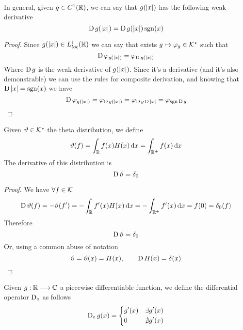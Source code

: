 \documentclass[../complete.tex]{subfiles}
\begin{document}
\begin{thm}
	In general, given $g\in C^1(\mathbb{R})$, we can say that $g(\abs{x})$ has the following weak derivative
	\begin{equation*}
		\operatorname{\mathrm{D}} g(\abs{x})=\operatorname{\mathrm{D}} g(\abs{x})\operatorname{sgn}(x)
	\end{equation*}
\end{thm}
\begin{proof}
	Since $g(\abs{x})\in L^1_{loc}(\mathbb{R})$ we can say that exists $g\mapsto\varphi_g\in\mathcal{K}^\star$ such that
	\begin{equation*}
		\operatorname{\mathrm{D}}\varphi_{g(\abs{x})}=\varphi_{\operatorname{\mathrm{D}} g(\abs{x})}
	\end{equation*}
	Where $\operatorname{\mathrm{D}} g$ is the weak derivative of $g(\abs{x})$. Since it's a derivative (and it's also demonstrable) we can use the rules for composite derivation, and knowing that $\operatorname{\mathrm{D}}\abs{x}=\operatorname{sgn}(x)$ we have
	\begin{equation*}
		\operatorname{\mathrm{D}}\varphi_{g(\abs{x})}=\varphi_{\operatorname{\mathrm{D}} g(\abs{x})}=\varphi_{\operatorname{\mathrm{D}} g\operatorname{\mathrm{D}}\abs{x}}=\varphi_{\operatorname{sgn}\operatorname{\mathrm{D}} g}
	\end{equation*}
\end{proof}
\begin{thm}
	Given $\vartheta\in\mathcal{K}^\star$ the theta distribution, we define
	\begin{equation*}
		\vartheta(f)=\int_{\mathbb{R}} f(x)H(x)\operatorname{d\!} x=\int_{\mathbb{R}^+}^{}f(x)\operatorname{d\!} x
	\end{equation*}
	The derivative of this distribution is
	\begin{equation*}
		\operatorname{\mathrm{D}}\vartheta=\delta_0
	\end{equation*}
\end{thm}
\begin{proof}
	We have $\forall f\in\mathcal{K}$
	\begin{equation*}
		\operatorname{\mathrm{D}}\vartheta(f)=-\vartheta(f')=-\int_{\mathbb{R}}^{}f'(x)H(x)\operatorname{d\!} x=-\int_{\mathbb{R}^+}f'(x)\operatorname{d\!} x=f(0)=\delta_0(f)
	\end{equation*}
	Therefore
	\begin{equation*}
		\operatorname{\mathrm{D}}\vartheta=\delta_0
	\end{equation*}
	Or, using a common abuse of notation
	\begin{equation*}
		\vartheta=\vartheta(x)=H(x),\qquad \operatorname{\mathrm{D}} H(x)=\delta(x)
	\end{equation*}
\end{proof}
\begin{ntn}
	Given $g:\mathbb{R}\overset{}{\longrightarrow}\mathbb{C}$ a piecewise differentiable function, we define the differential operator $\operatorname{D_{\circ}}$ as follows
	\begin{equation}
		\operatorname{D_{\circ}} g(x)=\begin{dcases}
			g'(x)&\exists g'(x)\\
			0&\nexists g'(x)
		\end{dcases}
		\label{eq:dodoperator}
	\end{equation}
\end{ntn}
\end{document}
